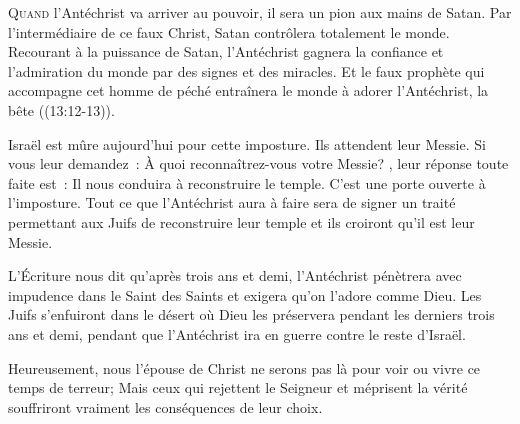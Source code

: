 


\lettrine{Q}{uand} l'Antéchrist va arriver au pouvoir, 
 il sera un pion aux mains de Satan. Par l'intermédiaire de ce faux Christ,
 Satan contrôlera totalement le monde. Recourant à la puissance de Satan,
 l'Antéchrist gagnera la confiance et l'admiration du monde
 par des signes et des miracles.
 Et le faux prophète qui accompagne cet homme de péché entraînera le monde
 à adorer l'Antéchrist, la \og bête \fg{} ((13:12-13)). 



Israël est mûre aujourd'hui pour cette imposture. Ils attendent leur Messie.
 Si vous leur demandez~: 
 \og À quoi reconnaîtrez-vous votre Messie? \fg{},
 leur réponse toute faite est~: 
 \og Il nous conduira à reconstruire le temple. \fg{}
 C'est une porte ouverte à l'imposture. Tout ce que l'Antéchrist
 aura à faire sera de signer un traité permettant aux Juifs
 de reconstruire leur temple \ocadr et ils croiront qu'il est leur Messie. 

L'Écriture nous dit qu'après trois ans et demi,
 l'Antéchrist pénètrera avec impudence dans le Saint des Saints
 et exigera qu'on l'adore comme Dieu. Les Juifs s'enfuiront dans le désert
 où Dieu les préservera pendant les derniers trois ans et demi,
 pendant que l'Antéchrist ira en guerre contre le reste d'Israël. 

Heureusement, nous \ocadr l'épouse de Christ \fcadr{} ne serons pas là
 pour voir ou vivre ce temps de terreur; Mais ceux qui rejettent le Seigneur
 et méprisent 
 la vérité souffriront vraiment les conséquences 
 de leur choix. 

\dvrule




